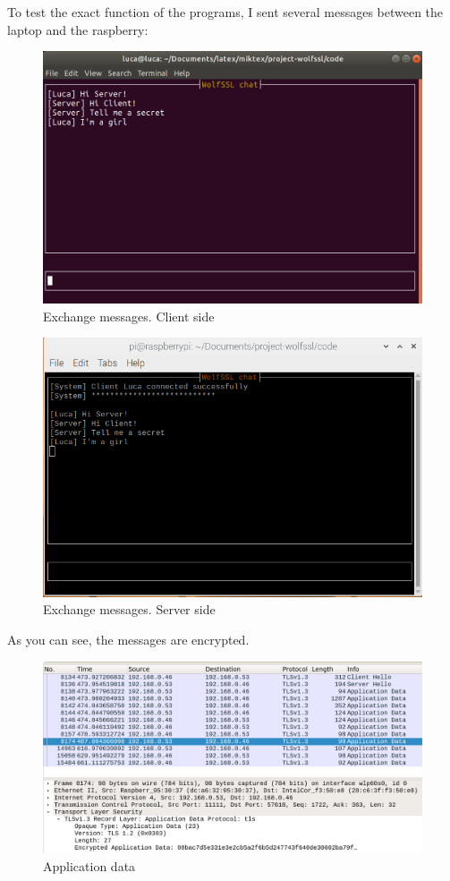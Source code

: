 \documentclass[a4paper,12pt]{article}
\begin{document}
To test the exact function of the programs, I sent several messages between the laptop and the raspberry:
\begin{figure}[H]
    \centering
    \includegraphics[scale=0.20]{./code/img/2-client.png}
    \caption{Exchange messages. Client side}
    
\end{figure}
\begin{figure}[H]
    \centering
    \includegraphics[scale=0.44]{./code/img/3-server.png}
    \caption{Exchange messages. Server side}
    
\end{figure}


As you can see, the messages are encrypted.
\begin{figure}[H]
    \centering
    \includegraphics[scale=0.248]{./code/img/application_data.png}
    \caption{Application data}
    
\end{figure}
\end{document}
